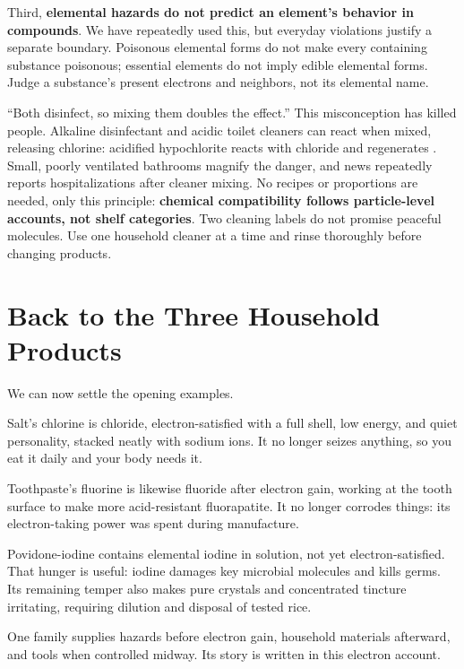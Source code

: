 Third, \textbf{elemental hazards do not predict an element's behavior in compounds}. We have repeatedly used this, but everyday violations justify a separate boundary. Poisonous elemental forms do not make every containing substance poisonous; essential elements do not imply edible elemental forms. Judge a substance's present electrons and neighbors, not its elemental name.

\begin{wuqu}
``Both disinfect, so mixing them doubles the effect.'' This misconception has killed people. Alkaline  disinfectant and acidic toilet cleaners can react when mixed, releasing chlorine: acidified hypochlorite reacts with chloride and regenerates . Small, poorly ventilated bathrooms magnify the danger, and news repeatedly reports hospitalizations after cleaner mixing. No recipes or proportions are needed, only this principle: \textbf{chemical compatibility follows particle-level accounts, not shelf categories}. Two cleaning labels do not promise peaceful molecules. Use one household cleaner at a time and rinse thoroughly before changing products.
\end{wuqu}

\section{Back to the Three Household Products}

We can now settle the opening examples.

Salt's chlorine is chloride, electron-satisfied with a full shell, low energy, and quiet personality, stacked neatly with sodium ions. It no longer seizes anything, so you eat it daily and your body needs it.

Toothpaste's fluorine is likewise fluoride after electron gain, working at the tooth surface to make more acid-resistant fluorapatite. It no longer corrodes things: its electron-taking power was spent during manufacture.

Povidone-iodine contains elemental iodine in solution, not yet electron-satisfied. That hunger is useful: iodine damages key microbial molecules and kills germs. Its remaining temper also makes pure crystals and concentrated tincture irritating, requiring dilution and disposal of tested rice.

One family supplies hazards before electron gain, household materials afterward, and tools when controlled midway. Its story is written in this electron account.

